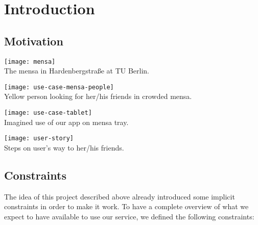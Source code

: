 \chapter{Introduction}
\label{cha:introduction}


\section{Motivation}

\begin{center}
    \texttt{[image: mensa]}\\
    The mensa in Hardenbergstraße at TU Berlin.
\end{center}

\begin{center}
    \texttt{[image: use-case-mensa-people]}\\
    Yellow person looking for her/his friends in crowded mensa.
\end{center}

\begin{center}
    \texttt{[image: use-case-tablet]}\\
    Imagined use of our app on mensa tray.
\end{center}

\begin{center}
    \texttt{[image: user-story]}\\
    Steps on user's way to her/his friends.
\end{center}


\section{Constraints}

The idea of this project described above already introduced some implicit constraints in order to make it work. To have a complete overview of what we expect to have available to use our service, we defined the following constraints:

